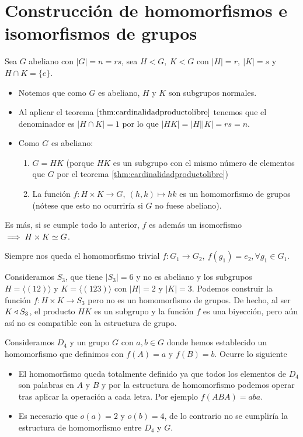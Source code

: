 \section{Construcción de homomorfismos e isomorfismos de grupos}

Sea $G$ abeliano con $|G| = n = rs$, sea $H < G,\ K < G$ con $|H| = r,\ |K| = s$ y $H\cap K = \{e\}$.
\begin{itemize}
	\item Notemos que como $G$ es abeliano, $H$ y $K$ son subgrupos normales.
	\item Al aplicar el teorema $\ref{thm:cardinalidadproductolibre}$ tenemos que el denominador es $|H\cap K| = 1$ por lo que $|HK| = |H| |K| = rs= n$.
	\item Como $G$ es abeliano:
	\begin{enumerate}
		\item $G = HK$ (porque $HK$ es un subgrupo con el mismo número de elementos que $G$ por el teorema \ref{thm:cardinalidadproductolibre})
		\item La función $f:H\times K \to G,\ (h, k)\mapsto hk$ es un homomorfismo de grupos (nótese que esto no ocurriría si $G$ no fuese abeliano).
	\end{enumerate}
\end{itemize}

Es más, si se cumple todo lo anterior, $f$ es además un isomorfismo $\implies H\times K \simeq G$.

\begin{ej}Siempre nos queda el homomorfismo trivial $f:G_1 \to G_2,\ f(g_1) = e_2, \forall g_1 \in G_1$.
\end{ej}

\begin{ej}
	\label{ej:nohomoentreproducto}
	Consideramos $S_3$, que tiene $|S_3| = 6$ y no es abeliano y los subgrupos $H = \langle (12) \rangle$ y $K = \langle (123) \rangle$ con $|H| = 2$ y $|K| = 3$. Podemos construir la función $f:H\times K \to S_3$ pero no es un homomorfismo de grupos. De hecho, al ser $K \mathbin{\triangleleft} S_3$, el producto $HK$ es un subgrupo y la función $f$ es una biyección, pero aún así no es compatible con la estructura de grupo.
\end{ej}

\begin{ej}
	Consideramos $D_4$ y un grupo $G$ con $a,b \in G$ donde hemos establecido un homomorfismo que definimos con $f(A) = a$ y $f(B) = b$. Ocurre lo siguiente
	\begin{itemize}
		\item El homomorfismo queda totalmente definido ya que todos los elementos de $D_4$ son palabras en $A$ y $B$ y por la estructura de homomorfismo podemos operar tras aplicar la operación a cada letra. Por ejemplo $f(ABA) = aba$.
		\item Es necesario que $o(a) = 2$ y $o(b) = 4$, de lo contrario no se cumpliría la estructura de homomorfismo entre $D_4$ y $G$.
	\end{itemize}
\end{ej}


